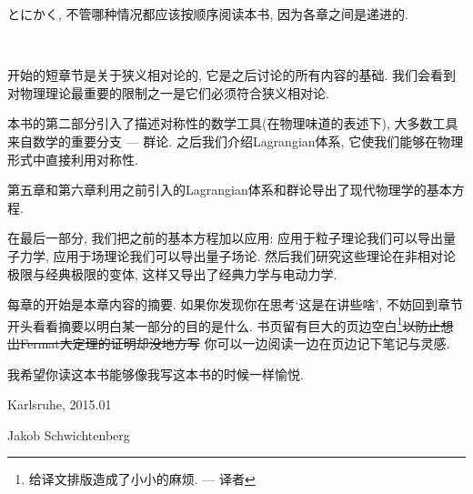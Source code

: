\documentclass[hyperref, UTF8]{ctexart}
\begin{document}
とにかく, 不管哪种情况都应该按顺序阅读本书, 因为各章之间是递进的.

\ 

开始的短章节是关于狭义相对论的, 它是之后讨论的所有内容的基础. 我们会看到对物理理论最重要的限制之一是它们必须符合狭义相对论. 

本书的第二部分引入了描述对称性的数学工具(在物理味道的表述下), 大多数工具来自数学的重要分支 --- 群论. 之后我们介绍Lagrangian体系, 它使我们能够在物理形式中直接利用对称性. 

第五章和第六章利用之前引入的Lagrangian体系和群论导出了现代物理学的基本方程. 

在最后一部分, 我们把之前的基本方程加以应用: %
应用于粒子理论我们可以导出量子力学, 应用于场理论我们可以导出量子场论. 然后我们研究这些理论在非相对论极限与经典极限的变体, 这样又导出了经典力学与电动力学.

每章的开始是本章内容的摘要. 如果你发现你在思考`这是在讲些啥', 不妨回到章节开头看看摘要以明白某一部分的目的是什么. 书页留有巨大的页边空白\footnote{给译文排版造成了小小的麻烦. --- 译者}\sout{以防止想出Fermat大定理的证明却没地方写}
你可以一边阅读一边在页边记下笔记与灵感.

我希望你读这本书能够像我写这本书的时候一样愉悦.

\begin{flushright}
Karlsruhe, 2015.01

Jakob Schwichtenberg
\end{flushright}
\end{document}
